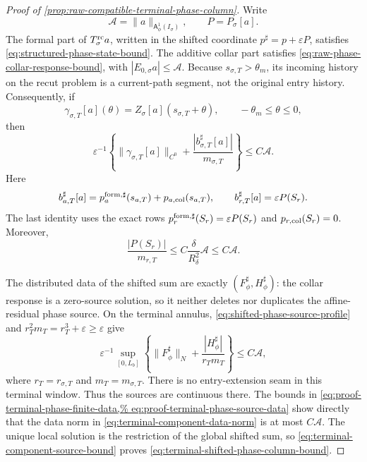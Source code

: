 \begin{proof}[Proof of
\cref{prop:raw-compatible-terminal-phase-column}]
Write
\[
 \mathcal A=\|a\|_{\mathsf A_\phi^1(I_\sigma)},\qquad
 P=P_\sigma[a].
\]
The formal part of \(T_\sigma^{\rm rc}a\), written in the shifted
coordinate \(p^\sharp=p+\varepsilon P\), satisfies
\cref{eq:structured-phase-state-bound}.  The additive collar part satisfies
\cref{eq:raw-phase-collar-response-bound}, with
\(|E_{0,\sigma}a|\le\mathcal A\).  Because
\(s_{\sigma,T}>\theta_m\), its incoming history on the recut problem is a
current-path segment, not the original entry history.  Consequently, if
\begin{equation}
 \gamma_{\sigma,T}[a](\theta)
 =Z_\sigma[a](s_{\sigma,T}+\theta),\qquad
 -\theta_m\le\theta\le0,                         \label{eq:proof-terminal-phase-incoming-history}
\end{equation}
then
\begin{equation}
 \varepsilon^{-1}\left\{
   \|\gamma_{\sigma,T}[a]\|_{C^0}
   +\frac{|b_{\sigma,T}^\sharp[a]|}{m_{\sigma,T}}
             \right\}\le C\mathcal A.          \label{eq:proof-terminal-phase-finite-data}
\end{equation}
Here
\[
 b_{a,T}^\sharp[a]
  =p_a^{\rm form,\sharp}(s_{a,T})+p_{a,\rm col}(s_{a,T}),
 \qquad
 b_{r,T}^\sharp[a]=\varepsilon P(S_r).
\]
The last identity uses the exact rows
\(p_r^{\rm form,\sharp}(S_r)=\varepsilon P(S_r)\) and
\(p_{r,\rm col}(S_r)=0\).  Moreover,
\[
 \frac{|P(S_r)|}{m_{r,T}}
 \le C\frac{\delta}{R_\delta^2}\mathcal A
 \le C\mathcal A.
\]

The distributed data of the shifted sum are exactly
\((F_\phi^\sharp,H_\phi^\sharp)\): the collar response is a zero-source
solution, so it neither deletes nor duplicates the affine-residual phase
source.  On the terminal annulus,
\cref{eq:shifted-phase-source-profile} and
\(r_T^2m_T=r_T^3+\varepsilon\ge\varepsilon\) give
\begin{equation}
 \varepsilon^{-1}\sup_{[0,L_b]}
 \left\{\|F_\phi^\sharp\|_N
       +\frac{|H_\phi^\sharp|}{r_Tm_T}\right\}
 \le C\mathcal A,                                \label{eq:proof-terminal-phase-source-data}
\end{equation}
where \(r_T=r_{\sigma,T}\) and \(m_T=m_{\sigma,T}\).
There is no entry-extension seam in this terminal window.  Thus the sources
are continuous there.  The bounds in
\cref{eq:proof-terminal-phase-finite-data,%
eq:proof-terminal-phase-source-data} show directly that the data norm in
\cref{eq:terminal-component-data-norm} is at most \(C\mathcal A\).
The unique local solution is the restriction of the global shifted sum, so
\cref{eq:terminal-component-source-bound} proves
\cref{eq:terminal-shifted-phase-column-bound}.


\end{proof}
